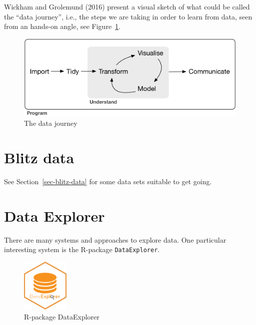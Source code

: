 \documentclass[
  letterpaper,
  DIV=11,
  numbers=noendperiod]{scrreprt}
\theoremstyle{definition}
\theoremstyle{definition}
\theoremstyle{remark}
\begin{document}
Wickham and Grolemund (2016) present a visual sketch of what could be
called the ``data journey'', i.e., the steps we are taking in order to
learn from data, seen from an hands-on angle, see
Figure~\ref{fig-data-journey}.

\begin{figure}

{\centering \includegraphics{./img/data-journey.png}

}

\caption{\label{fig-data-journey}The data journey}

\end{figure}

\hypertarget{blitz-data}{%
\section{Blitz data}\label{blitz-data}}

See Section~\ref{sec-blitz-data} for some data sets suitable to get
going.

\hypertarget{data-explorer}{%
\section{Data Explorer}\label{data-explorer}}

There are many systems and approaches to explore data. One particular
interesting system is the R-package \texttt{DataExplorer}.

\begin{figure}

{\centering \includegraphics[width=0.2\textwidth,height=\textheight]{./img/dataexplorer-logo.png}

}

\caption{R-package DataExplorer}

\end{figure}
\end{document}

